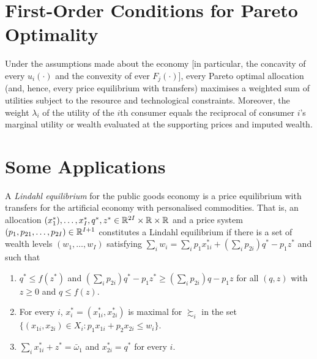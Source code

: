 \section{First-Order Conditions for Pareto Optimality}
\label{piv.chxvi.pareto-focs}

\begin{prop}
    Under the assumptions made about the economy [in particular, the concavity of every $u_i(\cdot)$ and the convexity of ever $F_j(\cdot)$], every Pareto optimal allocation (and, hence, every price equilibrium with transfers) maximises a weighted sum of utilities subject to the resource and technological constraints. Moreover, the weight $\lambda_i$ of the utility of the $i$th consumer equals the reciprocal of consumer $i$'s marginal utility or wealth evaluated at the supporting prices and imputed wealth.
\end{prop}


\section{Some Applications}

\begin{defn}
    A \emph{Lindahl equilibrium} for the public goods economy is a price equilibrium with transfers for the artificial economy with personalised commodities. That is, an allocation $(x^*_1), \dots, x^*_I, q^*, z^* \in \mathbb{R}^{2I} \times \mathbb{R} \times \mathbb{R}$ and a price system $(p_1, p_{21}, \dots, p_{2I}) \in \mathbb{R}^{I + 1}$ constitutes a Lindahl equilibrium if there is a set of wealth levels $(w_1, \dots, w_I)$ satisfying $\sum_i w_i = \sum_i p_1 x^*_{1i} + (\sum_i p_{2i}) q^* - p_1 z^*$ and such that
    \begin{enumerate}
        \item $q^* \leq f(z^*)$ and $(\sum_i p_{2i}) q^* - p_1 z^* \geq (\sum_i p_{2i}) q - p_1 z$ for all $(q, z)$ with $z \geq 0$ and $q \leq f(z)$.
        \item For every $i$, $x^*_i = (x^*_{1i}, x^*_{2i})$ is maximal for $\succsim_i$ in the set $\{(x_{1i}, x_{2i}) \in X_i: p_1 x_{1i} + p_2 x_{2i} \leq w_i\}$.
        \item $\sum_i x^*_{1i} + z^* = \bar{\omega}_1$ and $x^*_{2i} = q^*$ for every $i$.
    \end{enumerate}
\end{defn}

